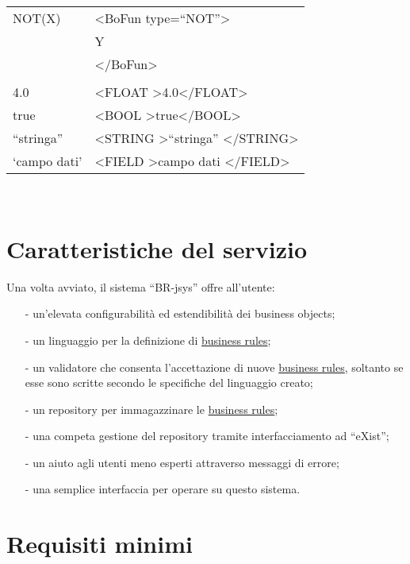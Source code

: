 \begin{table}[htbp]
\begin{tabular}{||p{3cm}||p{6.5cm}||}
\hline
NOT(X) & \textless BoFun type=``NOT''\textgreater \\
&  Y \\
& \textless /BoFun\textgreater \\ \hline
& \\ \hline 
4.0 & \textless FLOAT \textgreater4.0\textless /FLOAT\textgreater \\ \hline
true & \textless BOOL \textgreater true\textless /BOOL\textgreater \\ \hline
``stringa'' & \textless STRING \textgreater ``stringa'' \textless /STRING\textgreater \\ \hline
`campo dati' &\textless FIELD \textgreater campo dati \textless /FIELD\textgreater \\ \hline
\end{tabular} \\
\end{table}

\section{Caratteristiche del servizio}
Una volta avviato, il sistema ``BR-jsys'' offre all'utente:
\begin{itemize}
\item[-] un'elevata configurabilit\`a ed estendibilit\`a dei business objects;
\item[-] un linguaggio per la definizione di \underline{business rules};
\item[-] un validatore che consenta l'accettazione di nuove \underline{business rules}, soltanto se esse sono scritte secondo le specifiche del linguaggio creato;
\item[-] un repository per immagazzinare le \underline{business rules};
\item[-] una competa gestione del repository tramite interfacciamento ad ``eXist'';
\item[-] un aiuto agli utenti meno esperti attraverso  messaggi di errore;
\item[-] una semplice interfaccia per operare su questo sistema.
\end{itemize}
\section{Requisiti minimi}

